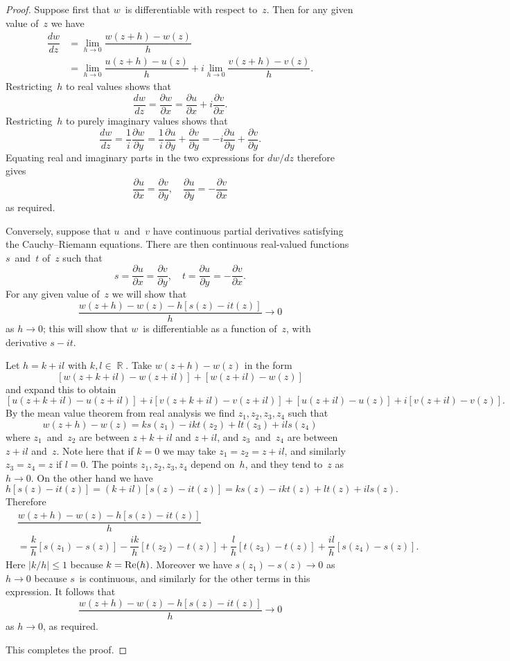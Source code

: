 \documentclass{amsproc}
\theoremstyle{definition}
\theoremstyle{remark}
\renewcommand{\Re}{\mathop{\textup{Re}}}
\renewcommand{\d}{\partial}
\DeclareMathOperator{\R}{\mathbb{R}}
\numberwithin{equation}{section}
\begin{document}
\begin{proof}
Suppose first that $ w $~is differentiable with respect to~$ z $. Then for any given value of~$ z $ we have
\begin{align*}
\dfrac{dw}{dz} &= \lim_{h \to 0} \dfrac{w(z + h) - w(z)}{h} \\
&= \lim_{h \to 0} \dfrac{u(z + h) - u(z)}{h} + i\lim_{h \to 0} \dfrac{v(z + h) - v(z)}{h}.
\end{align*}
Restricting~$ h $ to real values shows that
$$
\dfrac{dw}{dz} = \dfrac{\d w}{\d x} = \dfrac{\d u}{\d x} + i\dfrac{\d v}{\d x}.
$$
Restricting~$ h $ to purely imaginary values shows that
$$
\dfrac{dw}{dz}
= \dfrac{1}{i}\dfrac{\d w}{\d y}
= \dfrac{1}{i}\dfrac{\d u}{\d y} + \dfrac{\d v}{\d y}
= -i\dfrac{\d u}{\d y} + \dfrac{\d v}{\d y}.
$$
Equating real and imaginary parts in the two expressions for $ dw/dz $ therefore gives
$$
\dfrac{\d u}{\d x} = \dfrac{\d v}{\d y}, \quad \dfrac{\d u}{\d y}=-\dfrac{\d v}{\d x}
$$
as required.

Conversely, suppose that $ u $~and~$ v $ have continuous partial derivatives satisfying the Cauchy--Riemann equations. There are then continuous real-valued
functions $ s $~and~$ t $ of~$ z $ such that
$$
s = \dfrac{\d u}{\d x} = \dfrac{\d v}{\d y},\quad t = \dfrac{\d u}{\d y} = -\dfrac{\d v}{\d x}.
$$
For any given value of~$ z $ we will show that
$$
\dfrac{w(z + h) - w(z) - h[s(z) - it(z)]}{h} \to 0
$$
as $ h \to 0 $; this will show that $ w $~is differentiable as a function of~$ z $, with derivative $ s - it $.

Let $ h = k + il $ with $ k,l \in \R $. Take $ w(z + h) - w(z) $ in the form
$$
[w(z + k + il) - w(z + il)] + [w(z + il) - w(z)]
$$
and expand this to obtain
$$
[u(z + k + il) - u(z + il)] + i[v(z + k+ il) - v(z + il)] + [u(z + il) - u(z)] + i[v(z +il) - v(z)].
$$
By the mean value theorem from real analysis we find $ z_1,z_2,z_3,z_4 $ such that
$$
w(z + h) - w(z) = ks(z_1) - ikt(z_2) + lt(z_3) + ils(z_4)
$$
where $ z_1 $~and~$ z_2 $ are between $ z + k + il $ and $ z + il $, and $ z_3 $~and~$ z_4 $ are between $ z + il $ and~$ z $.
Note here that if $ k = 0 $ we may take $ z_1 = z_2 = z + il $, and similarly $ z_3 = z_4 = z $ if $ l = 0 $.
The points $ z_1,z_2,z_3,z_4 $ depend on~$ h $, and they tend to~$ z $ as $ h \to 0 $. On the other hand we have
$$
h[s(z) - it(z)] = (k + il)[s(z) - it(z)] = ks(z) - ikt(z) + lt(z) + ils(z).
$$
Therefore
\begin{align*}
&\dfrac{w(z + h) - w(z) - h[s(z) - it(z)]}{h} \\
&= \dfrac{k}{h}[s(z_1) - s(z)]
-\dfrac{ik}{h}[t(z_2) - t(z)]
+\dfrac{l}{h}[t(z_3) - t(z)]
+\dfrac{il}{h}[s(z_4) - s(z)].
\end{align*}
Here $ |k/h| \leq 1 $ because $ k = \Re(h) $. Moreover we have $ s(z_1) - s(z) \to 0 $ as $ h \to 0 $ because $ s $~is continuous, and similarly for the other
terms in this expression. It follows that
$$
\dfrac{w(z + h) - w(z) - h[s(z) - it(z)]}{h} \to 0
$$
as $ h \to 0 $, as required.

This completes the proof.
\end{proof}
\end{document}
